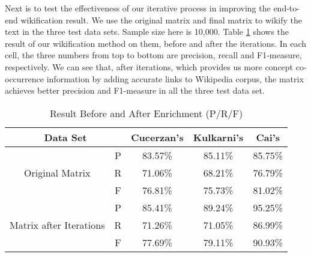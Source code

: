 Next is to test the effectiveness of our iterative process in
improving the end-to-end wikification result.
We use the original matrix and
final matrix to wikify the text in the three test data sets.
Sample size here is 10,000.
Table \ref{tab:result_ba} shows the result of our wikification
method on them, before and after the iterations. In each cell, the three numbers
from top to bottom are precision, recall and F1-measure, respectively.
We can see that, after iterations, which provides us more concept co-occurrence
information by adding accurate links to Wikipedia corpus, the matrix achieves
better precision and F1-measure in all the three test data set.

\begin{table}[th]
\centering
\begin{tabular}{|c|c|c|c|c|}
\hline
\multicolumn{2}{|c|}{Data Set} & Cucerzan's & Kulkarni's & Cai's \\
\hline \hline
&P& 83.57\% & 85.11\% & 85.75\% \\
Original Matrix &R& 71.06\% & 68.21\% & 76.79\% \\
&F& 76.81\% & 75.73\% & 81.02\% \\
\hline
&P& 85.41\% & 89.24\% & 95.25\% \\
Matrix after Iterations &R& 71.26\% & 71.05\% & 86.99\% \\
&F& 77.69\% & 79.11\% & 90.93\% \\
\hline
\end{tabular}
\caption{Result Before and After Enrichment (P/R/F)}
\label{tab:result_ba}
\end{table}

